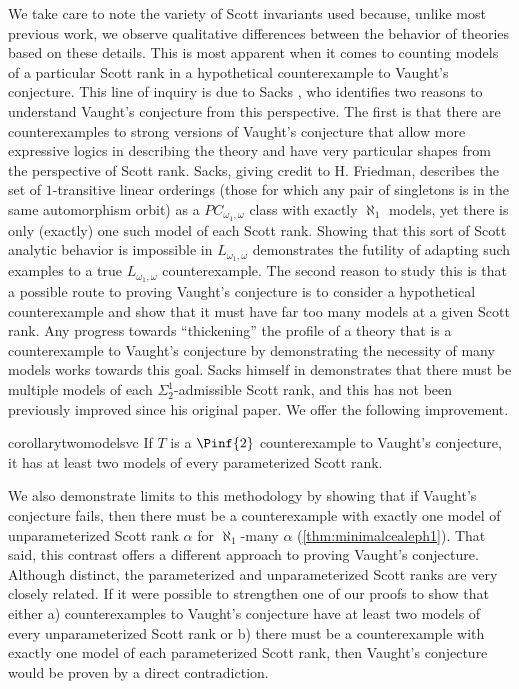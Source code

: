 \documentclass[10pt,a4paper]{amsart}
\renewcommand{\-}{\text{-}}
\begin{document}
We take care to note the variety of Scott invariants used because, unlike most previous work, we observe qualitative differences between the behavior of theories based on these details.
This is most apparent when it comes to counting models of a particular Scott rank in a hypothetical counterexample to Vaught's conjecture.
This line of inquiry is due to Sacks \cite{Sac83}, who identifies two reasons to understand Vaught's conjecture from this perspective.
The first is that there are counterexamples to strong versions of Vaught's conjecture that allow more expressive logics in describing the theory and have very particular shapes from the perspective of Scott rank.
Sacks, giving credit to H. Friedman, describes the set of $1$-transitive linear orderings (those for which any pair of singletons is in the same automorphism orbit) as a $PC_{\omega_1,\omega}$ class with exactly $\aleph_1$ models, yet there is only (exactly) one such model of each Scott rank.
Showing that this sort of Scott analytic behavior is impossible in $L_{\omega_1,\omega}$ demonstrates the futility of adapting such examples to a true $L_{\omega_1,\omega}$ counterexample.
The second reason to study this is that a possible route to proving Vaught's conjecture is to consider a hypothetical counterexample and show that it must have far too many models at a given Scott rank.
Any progress towards ``thickening'' the profile of a theory that is a counterexample to Vaught's conjecture by demonstrating the necessity of many models works towards this goal.
Sacks himself in \cite{Sac83} demonstrates that there must be multiple models of each $\Sigma_2^1$-admissible Scott rank, and this has not been previously improved since his original paper.
We offer the following improvement.
\begin{restatable*}{corollary}{twomodelsvc}\label{cor:2ModelsVC}
If $T$ is a $\Pinf{2}$ counterexample to Vaught's conjecture, it has at least two models of every parameterized Scott rank.
\end{restatable*}
We also demonstrate limits to this methodology by showing that if Vaught's conjecture fails, then there must be a counterexample with exactly one model of unparameterized Scott rank $\alpha$ for $\aleph_1$-many $\alpha$ (\cref{thm:minimalcealeph1}).
That said, this contrast offers a different approach to proving Vaught's conjecture.
Although distinct, the parameterized and unparameterized Scott ranks are very closely related.
If it were possible to strengthen one of our proofs to show that either a) counterexamples to Vaught's conjecture have at least two models of every unparameterized Scott rank or b) there must be a counterexample with exactly one model of each parameterized Scott rank, then Vaught's conjecture would be proven by a direct contradiction.
\end{document}
